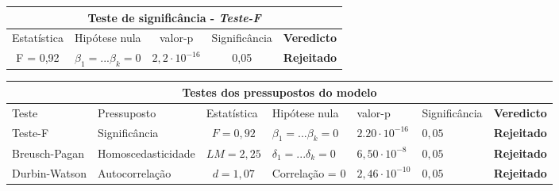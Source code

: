 \documentclass{article}
\begin{document}
\begin{table}[]
		\centering
	\begin{tabular}{clcll}
		\hline 
		\multicolumn{5}{c}{\textbf{Teste de significância} - \textit{Teste-F}}                                                                                                    \\ \hline \hline
		Estatística & Hipótese nula                       & valor-p & Significância            & \textbf{Veredicto}                                            \\ \hline
		F = 0,92    & \multicolumn{1}{c}{$\beta_1 = ... \beta_k = 0$} & $2,2 \cdot 10^{-16}$    & \multicolumn{1}{c}{0,05} & \multicolumn{1}{c}{{\color[HTML]{036400} \textbf{Rejeitado}}} \\ \hline 
	\end{tabular}
\end{table}


\begin{table}[]
	\centering
	\begin{tabular}{lccllll}
		\hline
		\multicolumn{7}{c}{\textbf{Testes dos pressupostos do modelo}}  
		                                \\ \hline
		\multicolumn{1}{l|}{Teste}  & \multicolumn{1}{l}{Pressuposto} & \multicolumn{1}{l}{Estatística} & \multicolumn{1}{l}{Hipótese nula} & \multicolumn{1}{l}{valor-p} &\multicolumn{1}{l}{Significância} & \multicolumn{1}{l}{\textbf{Veredicto}} \\ \hline
		
		\multicolumn{1}{l|}{Teste-F} & \multicolumn{1}{l}{Significância}  & $F = 0,92$    & $\beta_1 = ... \beta_k = 0$ &   $2.20 \cdot 10^{-16}$    & $0,05$ & {\color[HTML]{036400} \textbf{Rejeitado}} \\
		\multicolumn{1}{l|}{Breusch-Pagan} & \multicolumn{1}{l}{Homoscedasticidade}    & $LM = 2,25$   & $\delta_1 = ... \delta_k = 0$ &    $6,50 \cdot 10^{-8}$    & $0,05$ &   {\color[HTML]{FE0000} \textbf{Rejeitado}}                 \\
		
		\multicolumn{1}{l|}{Durbin-Watson} & \multicolumn{1}{l}{Autocorrelação} & $d= 1,07$    & Correlação = $0$ &   $2,46 \cdot 10^{-10}$   & $0,05$ &   {\color[HTML]{FE0000} \textbf{Rejeitado}}                 \\ \hline
	\end{tabular}
\end{table}
\end{document}
